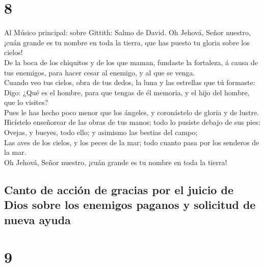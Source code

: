\hypertarget{section-19-8}{%
\section{8}\label{section-19-8}}

 Al Músico principal: sobre Gittith: Salmo de David. Oh
Jehová, Señor nuestro, ¡cuán grande es tu nombre en toda la tierra, que
has puesto tu gloria sobre los cielos!\\
 De la boca de los chiquitos y de los que maman, fundaste
la fortaleza, á causa de tus enemigos, para hacer cesar al enemigo, y al
que se venga.\\
 Cuando veo tus cielos, obra de tus dedos, la luna y las
estrellas que tú formaste:\\
 Digo: ¿Qué es el hombre, para que tengas de él memoria, y
el hijo del hombre, que lo visites?\\
 Pues le has hecho poco menor que los ángeles, y
coronástelo de gloria y de lustre.\\
 Hicístelo enseñorear de las obras de tus manos; todo lo
pusiste debajo de sus pies:\\
 Ovejas, y bueyes, todo ello; y asimismo las bestias del
campo;\\
 Las aves de los cielos, y los peces de la mar; todo
cuanto pasa por los senderos de la mar.\\
 Oh Jehová, Señor nuestro, ¡cuán grande es tu nombre en
toda la tierra!

\hypertarget{canto-de-acciuxf3n-de-gracias-por-el-juicio-de-dios-sobre-los-enemigos-paganos-y-solicitud-de-nueva-ayuda}{%
\subsection{Canto de acción de gracias por el juicio de Dios sobre los
enemigos paganos y solicitud de nueva
ayuda}\label{canto-de-acciuxf3n-de-gracias-por-el-juicio-de-dios-sobre-los-enemigos-paganos-y-solicitud-de-nueva-ayuda}}

\hypertarget{section-19-9}{%
\section{9}\label{section-19-9}}

